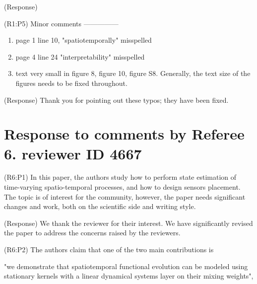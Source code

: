 \documentclass{letter}
\begin{document}
{\color{red}(Response)}


{\color{red}(R1:P5)} Minor comments
---------------
\begin{enumerate}
\item page 1 line 10, "spatiotemporally" misspelled
\item page 4 line 24 "interpretability" misspelled
\item text very small in figure 8, figure 10, figure S8. Generally, the
text size of the figures needs to be fixed throughout. 
\end{enumerate}

{\color{red}(Response)} Thank you for pointing out these typos; they have been fixed.



\section{Response to comments by Referee 6. reviewer ID 4667}

{\color{red}(R6:P1)} In this paper, the authors study how to perform state estimation of
time-varying spatio-temporal processes, and how to design sensors
placement. 
The topic is of interest for the community, however, the
paper needs significant changes and work, both on the scientific side
and writing style. 

{\color{red}(Response)} We thank the reviewer for their interest. We have significantly revised the paper to address the concerns raised by the reviewers.

{\color{red}(R6:P2)} The authors claim that one of the two main contributions is 

"we demonstrate that spatiotemporal functional evolution can be modeled
using stationary kernels with a linear dynamical systems layer on their
mixing weights",
\end{document}
